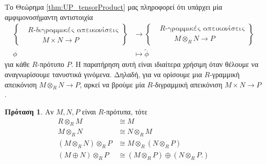 \documentclass[12pt,a4paper,reqno]{amsart}
\theoremstyle{definition}
\newtheorem{proposition}[theorem]{Πρόταση}
\theoremstyle{remark}
\numberwithin{theorem}{section}
\numberwithin{exercise}{section}
\numberwithin{equation}{section}
\renewcommand{\to}{\rightarrow}
\begin{document}
Το Θεώρημα \ref{thm:UP_tensorProduct} μας πληροφορεί ότι υπάρχει μία αμφιμονοσήμαντη αντιστοιχία 
\begin{align*}
\left\{
\begin{aligned}
&\text{$R$-διγραμμικές απεικονίσεις} \\
&\qquad M \times N \to P
\end{aligned}
\right\}
&\to
\left\{
\begin{aligned}
&\text{$R$-γραμμικές απεικονίσεις} \\
&\qquad M \otimes_R N \to P
\end{aligned}
\right\} \\
\phi &\mapsto \tilde{\phi}
\end{align*}
για κάθε $R$-πρότυπο $P$. Η παρατήρηση αυτή είναι ιδιαίτερα χρήσιμη όταν θέλουμε να αναγνωρίσουμε τανυστικά γινόμενα. Δηλαδή, για να ορίσουμε μια $R$-γραμμική απεικόνιση $M \otimes_R N \to P$, αρκεί να βρούμε μία $R$-διγραμμική απεικόνιση $M \times N \to P$.

\begin{proposition}
    \label{prop:tensor_product}
    Αν $M, N, P$ είναι $R$-πρότυπα, τότε 
    \begin{align}
        R \otimes_R M &\cong M \label{eq:RtensorM_M} \\
        M \otimes_R N &\cong N \otimes_R M \label{eq:tensor_commutativity} \\
        \left(
            M \otimes_R N
        \right) \otimes_R P &\cong M \otimes_R \left(N \otimes_R P\right) \label{eq:tensor_associativity} \\
        \left(
            M \oplus N
        \right) \otimes_R P &\cong 
        \left(
            M \otimes_R P
        \right) \oplus 
        \left(
            N \otimes_R P.
        \right) \label{eq:tensor_distributivity}
    \end{align}
\end{proposition}
\end{document}
